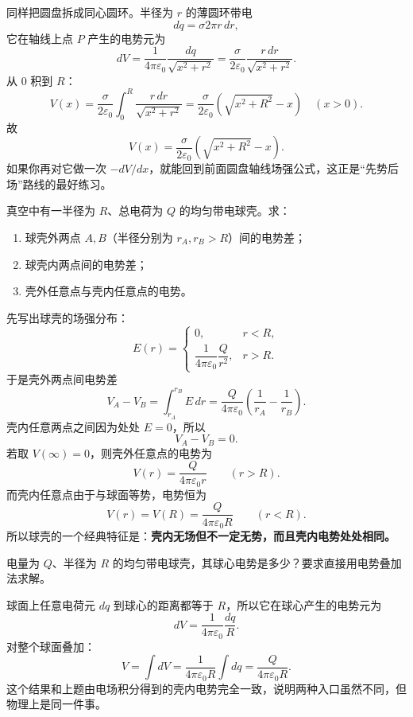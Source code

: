 \documentclass[lang=cn,11pt]{elegantbook}
\begin{document}
\begin{solution}
同样把圆盘拆成同心圆环。半径为 \(r\) 的薄圆环带电
\[
dq=\sigma 2\pi r\,dr,
\]
它在轴线上点 \(P\) 产生的电势元为
\[
dV=\frac{1}{4\pi\varepsilon_0}\frac{dq}{\sqrt{x^2+r^2}}
=\frac{\sigma}{2\varepsilon_0}\frac{r\,dr}{\sqrt{x^2+r^2}}.
\]
从 \(0\) 积到 \(R\)：
\[
V(x)=\frac{\sigma}{2\varepsilon_0}\int_0^R\frac{r\,dr}{\sqrt{x^2+r^2}}
=\frac{\sigma}{2\varepsilon_0}\left(\sqrt{x^2+R^2}-x\right)
\quad (x>0).
\]
故
\[
\boxed{
V(x)=\frac{\sigma}{2\varepsilon_0}\left(\sqrt{x^2+R^2}-x\right)
}.
\]
如果你再对它做一次 \(-dV/dx\)，就能回到前面圆盘轴线场强公式，这正是“先势后场”路线的最好练习。
\end{solution}

\begin{example}[均匀带电球壳的电势与电势差]
真空中有一半径为 \(R\)、总电荷为 \(Q\) 的均匀带电球壳。求：
\begin{enumerate}
  \item 球壳外两点 \(A,B\)（半径分别为 \(r_A,r_B>R\)）间的电势差；
  \item 球壳内两点间的电势差；
  \item 壳外任意点与壳内任意点的电势。
\end{enumerate}
\end{example}

\begin{solution}
先写出球壳的场强分布：
\[
E(r)=
\begin{cases}
0, & r<R,\\[4pt]
\dfrac{1}{4\pi\varepsilon_0}\dfrac{Q}{r^2}, & r>R.
\end{cases}
\]
于是壳外两点间电势差
\[
V_A-V_B=\int_{r_A}^{r_B}E\,dr
=\frac{Q}{4\pi\varepsilon_0}\left(\frac{1}{r_A}-\frac{1}{r_B}\right).
\]
壳内任意两点之间因为处处 \(E=0\)，所以
\[
V_A-V_B=0.
\]
若取 \(V(\infty)=0\)，则壳外任意点的电势为
\[
V(r)=\frac{Q}{4\pi\varepsilon_0 r}\qquad (r>R).
\]
而壳内任意点由于与球面等势，电势恒为
\[
V(r)=V(R)=\frac{Q}{4\pi\varepsilon_0 R}\qquad (r<R).
\]
所以球壳的一个经典特征是：\textbf{壳内无场但不一定无势，而且壳内电势处处相同。}
\end{solution}

\begin{example}[用叠加法重算带电球壳球心电势]
电量为 \(Q\)、半径为 \(R\) 的均匀带电球壳，其球心电势是多少？要求直接用电势叠加法求解。
\end{example}

\begin{solution}
球面上任意电荷元 \(dq\) 到球心的距离都等于 \(R\)，所以它在球心产生的电势元为
\[
dV=\frac{1}{4\pi\varepsilon_0}\frac{dq}{R}.
\]
对整个球面叠加：
\[
V=\int dV
=\frac{1}{4\pi\varepsilon_0R}\int dq
=\frac{Q}{4\pi\varepsilon_0R}.
\]
这个结果和上题由电场积分得到的壳内电势完全一致，说明两种入口虽然不同，但物理上是同一件事。
\end{solution}
\end{document}

